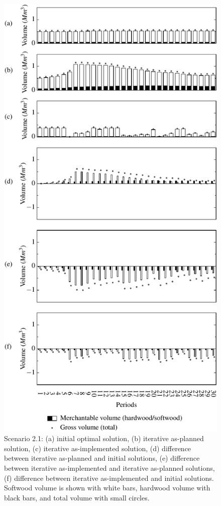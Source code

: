 \begin{figure}[ht!]
  \caption{Scenario 2.1: (a) initial optimal solution, (b) iterative
    as-planned solution, (c) iterative as-implemented solution, (d)
    difference between iterative as-planned and initial solutions, (e)
    difference between iterative as-implemented and iterative
    as-planned solutions, (f) difference between iterative
    as-implemented and initial solutions. Softwood volume is shown
    with white bars, hardwood volume with black bars, and total volume
    with small circles.}
  \label{fig:scenario2.1}
  \medskip
  \centering
  \includegraphics[width=0.60\columnwidth]{images/s2-2c}
\end{figure}

